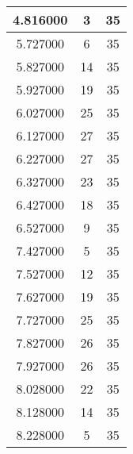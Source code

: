\begin{longtable}[htbp]{|c|c|c|}
4.816000 & 3 & 35 \\ \hline
5.727000 & 6 & 35 \\ \hline
5.827000 & 14 & 35 \\ \hline
5.927000 & 19 & 35 \\ \hline
6.027000 & 25 & 35 \\ \hline
6.127000 & 27 & 35 \\ \hline
6.227000 & 27 & 35 \\ \hline
6.327000 & 23 & 35 \\ \hline
6.427000 & 18 & 35 \\ \hline
6.527000 & 9 & 35 \\ \hline
7.427000 & 5 & 35 \\ \hline
7.527000 & 12 & 35 \\ \hline
7.627000 & 19 & 35 \\ \hline
7.727000 & 25 & 35 \\ \hline
7.827000 & 26 & 35 \\ \hline
7.927000 & 26 & 35 \\ \hline
8.028000 & 22 & 35 \\ \hline
8.128000 & 14 & 35 \\ \hline
8.228000 & 5 & 35 \\ \hline
\end{longtable}
